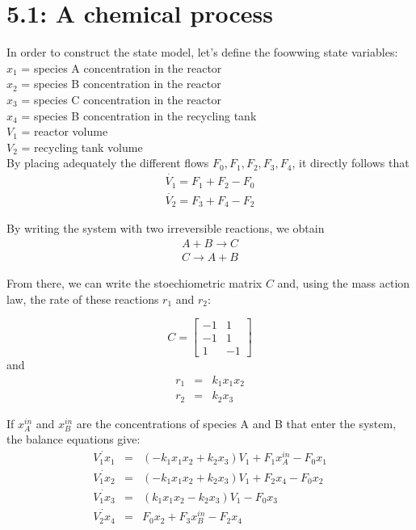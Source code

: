 

\section*{5.1: A chemical process}

In order to construct the state model, let's define the foowwing state variables:\\
\indent $x_1$ = species A concentration in the reactor\\
\indent $x_2$ = species B concentration in the reactor\\
\indent $x_3$ = species C concentration in the reactor\\
\indent $x_4$ = species B concentration in the recycling tank\\
\indent $V_1$ = reactor volume\\
\indent $V_2$ = recycling tank volume\\

By placing adequately the different flows $F_0, F_1, F_2, F_3, F_4$, it directly follows that
\begin{eqnarray*}
\dot{V_1} = F_1+F_2-F_0\\
\dot{V_2} = F_3+F_4-F_2
\end{eqnarray*}

By writing the system with two irreversible reactions, we obtain
\begin{eqnarray*}
A+B\rightarrow C \\
C\rightarrow A+B
\end{eqnarray*}

From there, we can write the stoechiometric matrix $C$ and, using the mass action law, the rate of these reactions $r_1$ and $r_2$:

\begin{equation*}
C = \begin{bmatrix}
-1 & 1\\
-1 & 1\\
1 & -1
\end{bmatrix}
\end{equation*}
and
\begin{eqnarray*}
r_1 &=& k_1 x_1 x_2\\
r_2 &=& k_2 x_3 
\end{eqnarray*}


If $x_A^{in}$ and $x_B^{in}$ are the concentrations of species A and B that enter the system, the balance equations give:
\begin{eqnarray*}
\dot{V_1x_1} &=& (-k_1 x_1 x_2+k_2 x_3 )V_1 + F_1 x_A^{in} - F_0 x_1 \\
\dot{V_1x_2} &=& (-k_1 x_1 x_2+k_2 x_3 )V_1 + F_2 x_4 - F_0 x_2 \\
\dot{V_1x_3} &=& (k_1 x_1 x_2-k_2 x_3 )V_1  - F_0 x_3 \\
\dot{V_2x_4} &=& F_0 x_2 + F_3 x_B^{in} - F_2 x_4
\end{eqnarray*}

